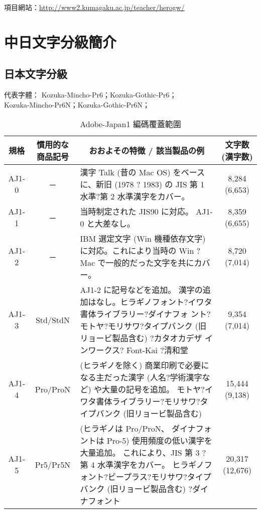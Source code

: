 \begin{appendix}
項目網站：\url{http://www2.kumagaku.ac.jp/teacher/herogw/}

\clearpage
\section{中日文字分級簡介}
\subsection{日本文字分級}
{\gtfamily
代表字體： Kozuka-Mincho-Pr6；Kozuka-Gothic-Pr6；\\
\qquad \qquad \qquad Kozuka-Mincho-Pr6N；Kozuka-Gothic-Pr6N；}

\begin{table}[h]
\caption{\fontsize{12pt}{15pt}\selectfont Adobe-Japan1 編碼覆蓋範圍} %
\centering %
\begin{tabular}{|c|c|p{8cm}|c|}%
\hline  %

規格 & 慣用的な商品記号	& \multicolumn{1}{|c|}{おおよその特徴 / 該当製品の例} & 文字数(漢字数) \\

\hline  %
AJ1-0 &	─	 & 漢字 Talk (昔の Mac OS)
をベースに、新旧 (1978 ? 1983) の JIS 第 1 水準?第 2 水準漢字をカバー。
& 8,284 (6,653) \\
\hline
AJ1-1	& ─ &	当時制定された JIS90 に対応。
AJ1-0 と大差なし。 & 	8,359 (6,655) \\
\hline
AJ1-2	& ─	 &  IBM 選定文字 (Win 機種依存文字)
に対応。これにより当時の Win ? Mac で一般的だった文字を共にカバー。
& 	8,720 (7,014) \\
\hline

AJ1-3	& Std/StdN	&   AJ1-2 に記号などを追加。
漢字の追加はなし。ヒラギノフォント?イワタ書体ライブラリー?ダイナフォ
ント?モトヤ?モリサワ?タイプバンク (旧リョービ製品含む) ?カタオカデザ
インワークス? Font-Kai ?清和堂 & 9,354 (7,014) \\

\hline
AJ1-4	& Pro/ProN &
(ヒラギノを除く)	商業印刷で必要になる主だった漢字
(人名?学術漢字など) や大量の記号を追加。
モトヤ?イワタ書体ライブラリー?モリサワ?タイプバンク
(旧リョービ製品含む)  & 15,444 (9,138) \\
\hline
AJ1-5	& Pr5/Pr5N &
(ヒラギノは Pro/ProN、
ダイナフォントは Pro-5)	使用頻度の低い漢字を大量追加。
これにより、JIS 第 3 ?第 4 水準漢字をカバー。
ヒラギノフォント?ビープラス?モリサワ?タイプバンク
(旧リョービ製品含む) ?ダイナフォント  & 20,317 (12,676) \\


\end{tabular}
\end{table}
\end{appendix}
